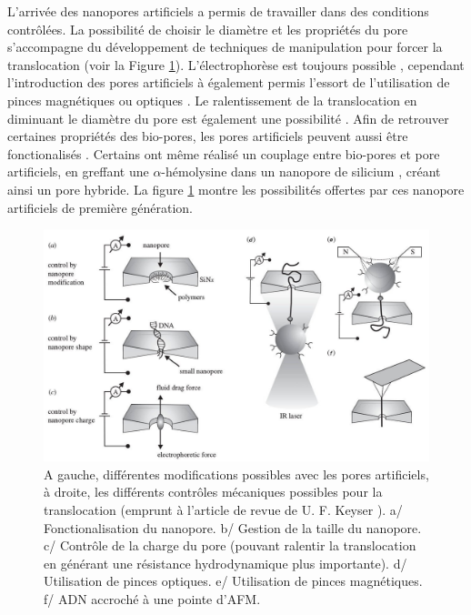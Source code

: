 L'arrivée des nanopores artificiels a permis de travailler dans des conditions contrôlées. La possibilité de choisir le diamètre et les propriétés du pore s'accompagne du développement de techniques de manipulation pour forcer la translocation (voir la Figure \ref{solidstateporepossib}). L'électrophorèse est toujours possible \cite{Storm2005,2Storm2005,Wanunu2008}, cependant l'introduction des pores artificiels à également permis l'essort de l'utilisation de pinces magnétiques \cite{Peng2009} ou optiques \cite{Sischka2010}. Le ralentissement de la translocation en diminuant le diamètre du pore est également une possibilité \cite{Mirsaidov2010}. Afin de retrouver certaines propriétés des bio-pores, les pores artificiels peuvent aussi être fonctionalisés \cite{Mussi2010}. Certains ont même réalisé un couplage entre bio-pores et pore artificiels, en greffant une $\alpha$-hémolysine dans un nanopore de silicium \cite{Hall2010}, créant ainsi un pore hybride. La figure \ref{solidstateporepossib} montre les possibilités offertes par ces nanopore artificiels de première génération.


\begin{figure}[h!]
\begin{center}
\includegraphics[width=1.0\textwidth]{solidstatenanopore.jpg}


\caption[Pores artificiels et manipulations]{A gauche, différentes modifications possibles avec les pores artificiels, à droite, les différents contrôles mécaniques possibles pour la translocation (emprunt à l'article de revue de U. F. Keyser \cite{keyser}). a/ Fonctionalisation du nanopore. b/ Gestion de la taille du nanopore. c/ Contrôle de la charge du pore (pouvant ralentir la translocation en générant une résistance hydrodynamique plus importante). d/ Utilisation de pinces optiques. e/ Utilisation de pinces magnétiques. f/ ADN accroché à une pointe d'AFM.}
\label{solidstateporepossib}
\end{center}
\end{figure}



